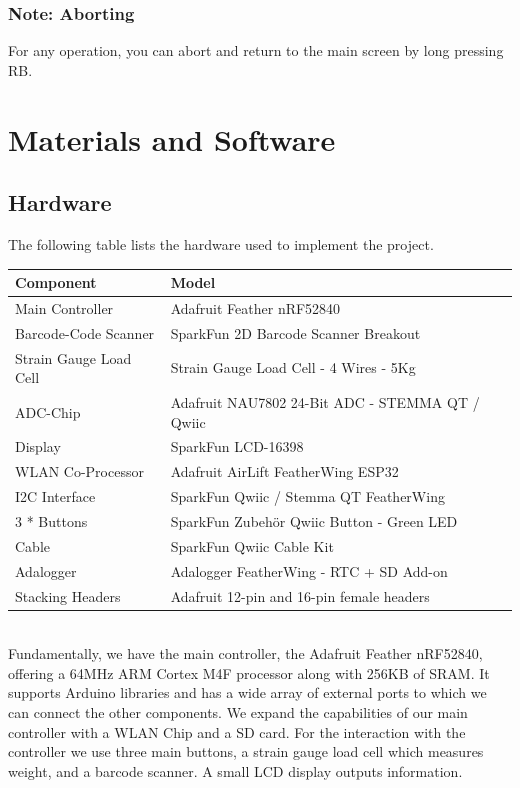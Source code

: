 \documentclass{article}
\begin{document}
\subsubsection{Note: Aborting}
For any operation, you can abort and return to the main screen by long pressing RB.

\newpage

\section{Materials and Software}
\subsection{Hardware}
The following table lists the hardware used to implement the project.
\\[10pt]

\begin{tabular}{l l}
	\hline
	Component              & Model                                           \\
	\hline
	Main Controller        & Adafruit Feather nRF52840                       \\
	Barcode-Code Scanner   & SparkFun 2D Barcode Scanner Breakout            \\
	Strain Gauge Load Cell & Strain Gauge Load Cell - 4 Wires - 5Kg          \\
	ADC-Chip               & Adafruit NAU7802 24-Bit ADC - STEMMA QT / Qwiic \\
	Display                & SparkFun LCD-16398                              \\
	WLAN Co-Processor      & Adafruit AirLift FeatherWing ESP32              \\
	I2C Interface          & SparkFun Qwiic / Stemma QT FeatherWing          \\
	3 * Buttons            & SparkFun Zubehör Qwiic Button - Green LED       \\
	Cable                  & SparkFun Qwiic Cable Kit                        \\
	Adalogger              & Adalogger FeatherWing - RTC + SD Add-on         \\
	Stacking Headers       & Adafruit 12-pin and 16-pin female headers       \\
	\hline
\end{tabular} \\[10pt]

Fundamentally, we have the main controller, the Adafruit Feather nRF52840, offering a 64MHz ARM Cortex M4F processor along with 256KB of SRAM.
It supports Arduino libraries and has a wide array of external ports to which we can connect the other components.
We expand the capabilities of our main controller with a WLAN Chip and a SD card.
For the interaction with the controller we use three main buttons, a strain gauge load cell which measures weight, and a barcode scanner.
A small LCD display outputs information.
\end{document}
